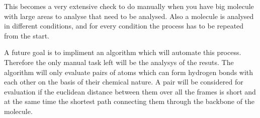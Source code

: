 \documentclass[11pt,twocolumn]{article}
\begin{document}
This becomes a very extensive check to do manually when you have big molecule
with large areas to analyse that need to be analysed. Also a molecule is
analysed in different conditions, and for every condition the process has to be
repeated from the start. 

A future goal is to impliment an algorithm which will automate this process.
Therefore the only manual task left will be the analysys of the resuts. The
algorithm will only evaluate pairs of atoms which can form hydrogen bonds with
each other on the basis of their chemical nature. A pair will be considered for
evaluation if the euclidean distance between them over all the frames is short
and at the same time the shortest path connecting them through the backbone of
the molecule. 





\end{document}
